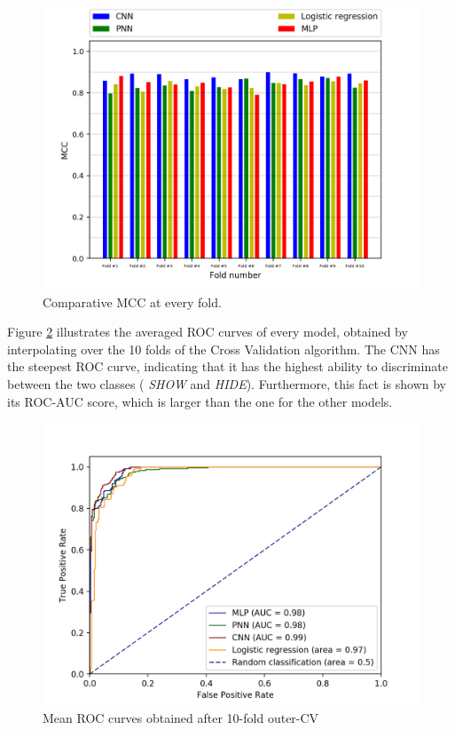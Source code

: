 		\begin{figure}[H]
			\centering
			\includegraphics[width=\textwidth]{graphics/MCC-per-fold}
			\caption{Comparative MCC at every fold.}
			\label{Fig: eval/ml/results/MCC-per-fold}
		\end{figure}
		Figure \ref{Fig: eval/ml/results/ROC} illustrates the averaged ROC curves of every model, obtained by interpolating over the 10 folds of the Cross Validation algorithm. The CNN has the steepest ROC curve, indicating that it has the highest ability to discriminate between the two classes ( \textit{SHOW} and \textit{HIDE}). Furthermore, this fact is shown by its ROC-AUC score, which is larger than the one for the other models.
		\begin{figure}[H]
			\centering
			\includegraphics[width=\textwidth]{graphics/ROC-curve}
			\caption{Mean ROC curves obtained after 10-fold outer-CV}
			\label{Fig: eval/ml/results/ROC}
		\end{figure}
